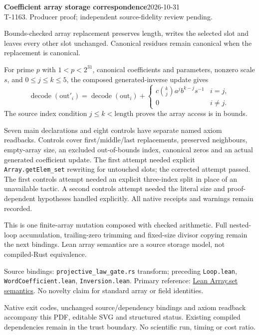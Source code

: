 \documentclass[10pt]{article}
\begin{document}
\textbf{Coefficient array storage correspondence}\hfill2026-10-31\\T-1163. Producer proof; independent source-fidelity review pending.

Bounds-checked array replacement preserves length, writes the selected slot and leaves every other slot unchanged. Canonical residues remain canonical when the replacement is canonical.

For prime $p$ with $1<p<2^{31}$, canonical coefficients and parameters, nonzero scale $s$, and $0\le j\le k\le5$, the composed generated-inverse update gives
\[
 \operatorname{decode}(\mathrm{out}'_i)=\operatorname{decode}(\mathrm{out}_i)+
 \begin{cases}c\binom{k}{j}a^jb^{k-j}s^{-1}&i=j,\\0&i\ne j.\end{cases}
\]
The source index condition $j\le k<\mathrm{length}$ proves the array access is in bounds.
\begin{center}\end{center}
Seven main declarations and eight controls have separate named axiom readbacks. Controls cover first/middle/last replacements, preserved neighbours, empty-array size, an excluded out-of-bounds index, canonical zeros and an actual generated coefficient update. The first attempt needed explicit \texttt{Array.getElem\_set} rewriting for untouched slots; the corrected attempt passed. The first controls attempt needed an explicit three-index split in place of an unavailable tactic. A second controls attempt needed the literal size and proof-dependent hypotheses handled explicitly. All native receipts and warnings remain recorded.

This is one finite-array mutation composed with checked arithmetic. Full nested-loop accumulation, trailing-zero trimming and fixed-size divisor copying remain the next bindings. Lean array semantics are a source storage model, not compiled-Rust equivalence.

Source bindings: \texttt{projective\_law\_gate.rs} transform; preceding \texttt{Loop.lean}, \texttt{WordCoefficient.lean}, \texttt{Inversion.lean}. Primary reference: \href{https://lean-lang.org/doc/api/Init/Data/Array/Set.html}{Lean Array.set semantics}. No novelty claim for standard array or field identities.

Native exit codes, unchanged source/dependency bindings and axiom readback accompany this PDF, editable SVG and structured status. Existing compiled dependencies remain in the trust boundary. No scientific run, timing or cost ratio.
\end{document}

